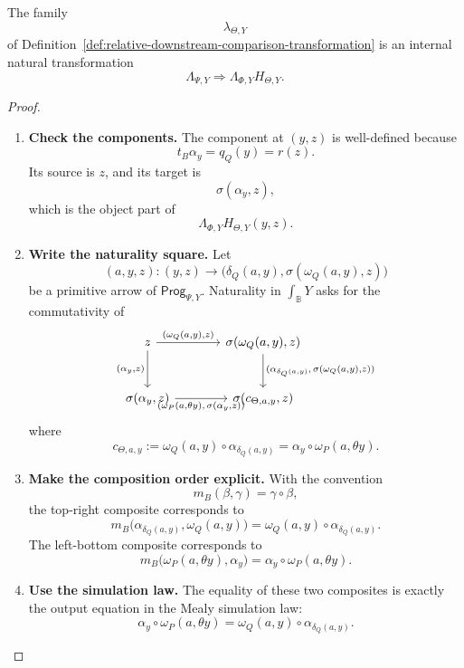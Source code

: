 \begin{theorem}
\label{thm:relative-output-comparison-natural}
The family
\[
\lambda_{\Theta,Y}
\]
of Definition~\ref{def:relative-downstream-comparison-transformation} is an
internal natural transformation
\[
\Lambda_{\Psi,Y}
\Rightarrow
\Lambda_{\Phi,Y}H_{\Theta,Y}.
\]
\end{theorem}

\begin{proof}
\leavevmode
\begin{enumerate}
\item \textbf{Check the components.}
The component at \((y,z)\) is well-defined because
\[
t_B\alpha_y=q_Q(y)=r(z).
\]
Its source is \(z\), and its target is
\[
\sigma(\alpha_y,z),
\]
which is the object part of
\[
\Lambda_{\Phi,Y}H_{\Theta,Y}(y,z).
\]

\item \textbf{Write the naturality square.}
Let
\[
(a,y,z):(y,z)\to
\bigl(\delta_Q(a,y),\sigma(\omega_Q(a,y),z)\bigr)
\]
be a primitive arrow of \(\mathsf{Prog}_{\Psi,Y}\). Naturality in
\(\int_{\mathbb B}Y\) asks for the commutativity of
\[
\begin{tikzcd}[column sep=large,row sep=large]
z
  \arrow[r,"{(\omega_Q(a,y),z)}"]
  \arrow[d,"{(\alpha_y,z)}"']
&
\sigma(\omega_Q(a,y),z)
  \arrow[d,"{(\alpha_{\delta_Q(a,y)},\,\sigma(\omega_Q(a,y),z))}"]
\\
\sigma(\alpha_y,z)
  \arrow[r,"{(\omega_P(a,\theta y),\,\sigma(\alpha_y,z))}"']
&
\sigma(c_{\Theta,a,y},z)
\end{tikzcd}
\]
where
\[
c_{\Theta,a,y}
:=
\omega_Q(a,y)\circ \alpha_{\delta_Q(a,y)}
=
\alpha_y\circ \omega_P(a,\theta y).
\]

\item \textbf{Make the composition order explicit.}
With the convention
\[
m_B(\beta,\gamma)=\gamma\circ\beta,
\]
the top-right composite corresponds to
\[
m_B\bigl(\alpha_{\delta_Q(a,y)},\omega_Q(a,y)\bigr)
=
\omega_Q(a,y)\circ\alpha_{\delta_Q(a,y)}.
\]
The left-bottom composite corresponds to
\[
m_B\bigl(\omega_P(a,\theta y),\alpha_y\bigr)
=
\alpha_y\circ\omega_P(a,\theta y).
\]

\item \textbf{Use the simulation law.}
The equality of these two composites is exactly the output equation in the
Mealy simulation law:
\[
\alpha_y\circ \omega_P(a,\theta y)
=
\omega_Q(a,y)\circ \alpha_{\delta_Q(a,y)}.
\]
\end{enumerate}
\end{proof}

